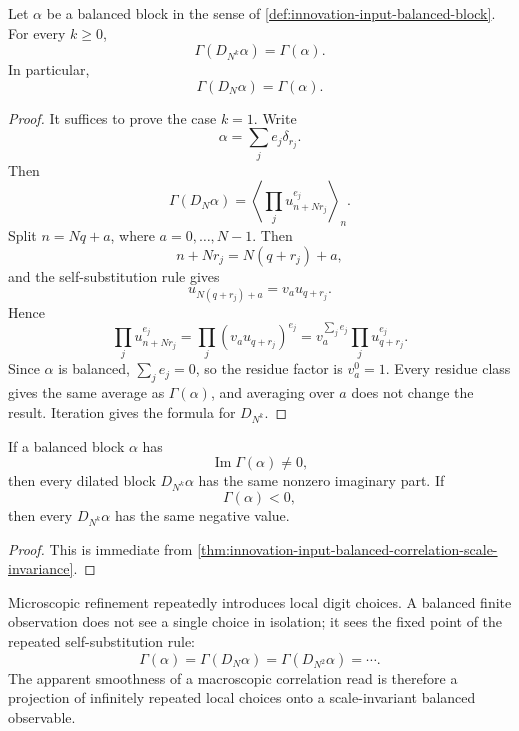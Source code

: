 \begin{theorem}
\label{thm:innovation-input-balanced-correlation-scale-invariance}
Let $\alpha$ be a balanced block in the sense of
\autoref{def:innovation-input-balanced-block}. For every $k\ge0$,
$$
\Gamma(D_{N^k}\alpha)=\Gamma(\alpha).
$$
In particular,
$$
\Gamma(D_N\alpha)=\Gamma(\alpha).
$$
\end{theorem}

\begin{proof}
It suffices to prove the case $k=1$. Write
$$
\alpha=\sum_j e_j\delta_{r_j}.
$$
Then
$$
\Gamma(D_N\alpha)
=
\left\langle
\prod_j u_{n+Nr_j}^{e_j}
\right\rangle_n.
$$
Split $n=Nq+a$, where $a=0,\ldots,N-1$. Then
$$
n+Nr_j=N(q+r_j)+a,
$$
and the self-substitution rule gives
$$
u_{N(q+r_j)+a}=v_a u_{q+r_j}.
$$
Hence
$$
\prod_j u_{n+Nr_j}^{e_j}
=
\prod_j (v_a u_{q+r_j})^{e_j}
=
v_a^{\sum_j e_j}
\prod_j u_{q+r_j}^{e_j}.
$$
Since $\alpha$ is balanced, $\sum_j e_j=0$, so the residue factor is
$v_a^0=1$. Every residue class gives the same average as $\Gamma(\alpha)$,
and averaging over $a$ does not change the result. Iteration gives the
formula for $D_{N^k}$.
\end{proof}

\begin{corollary}
\label{cor:innovation-input-scale-copying-correlation-defects}
If a balanced block $\alpha$ has
$$
\operatorname{Im}\Gamma(\alpha)\ne0,
$$
then every dilated block $D_{N^k}\alpha$ has the same nonzero imaginary
part. If
$$
\Gamma(\alpha)<0,
$$
then every $D_{N^k}\alpha$ has the same negative value.
\end{corollary}

\begin{proof}
This is immediate from
\autoref{thm:innovation-input-balanced-correlation-scale-invariance}.
\end{proof}

\begin{principle}
\label{prin:innovation-input-smooth-projection}
Microscopic refinement repeatedly introduces local digit choices. A
balanced finite observation does not see a single choice in isolation; it
sees the fixed point of the repeated self-substitution rule:
$$
\Gamma(\alpha)
=
\Gamma(D_N\alpha)
=
\Gamma(D_{N^2}\alpha)
=
\cdots.
$$
The apparent smoothness of a macroscopic correlation read is therefore a
projection of infinitely repeated local choices onto a scale-invariant
balanced observable.
\end{principle}

